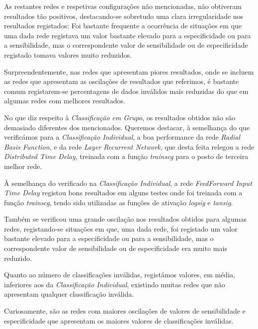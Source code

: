 \documentclass{article}
\begin{document}
As restantes redes e respetivas configurações não mencionadas, não obtiveram resultados tão positivos, destacando-se sobretudo uma clara irregularidade nos resultados registados: Foi bastante frequente a ocorrência de situações em que uma dada rede registava um valor bastante elevado para a especificidade ou para a sensibilidade, mas o correspondente valor de sensibilidade ou de especificidade registado tomava valores muito reduzidos.

Surpreendentemente, nas redes que apresentam piores resultados, onde se incluem as redes que apresentam as oscilações de resultados que referimos, é bastante comum registarem-se percentagens de dados inválidos mais reduzidas do que em algumas redes com melhores resultados.

No que diz respeito à \emph{Classificação em Grupo}, os resultados obtidos não são demasiado diferentes dos mencionados. Queremos destacar, à semelhança do que verificámos para a \emph{Classificação Individual}, a boa performance da rede \emph{Radial Basis Function}, e da rede \emph{Layer Recurrent Network}, que desta feita relegou a rede \emph{Distributed Time Delay}, treinada com a função \emph{trainscg} para o posto de terceira melhor rede.

À semelhança do verificado na \emph{Classificação Individual}, a rede \emph{FeedForward Input Time Delay} registou bons resultados em alguns testes onde foi treinada com a função \emph{trainscg}, tendo sido utilizadas as funções de ativação \emph{logsig} e \emph{tansig}.

Também se verificou uma grande oscilação nos resultados obtidos para algumas redes, registando-se situações em que, uma dada rede, foi registado um valor bastante elevado para a especificidade ou para a sensibilidade, mas o correspondente valor de sensibilidade ou de especificidade era muito mais reduzido.

Quanto ao número de classificações inválidas, registámos valores, em média, inferiores aos da \emph{Classificação Individual}, existindo muitas redes que não apresentam qualquer classificação inválida.

Curiosamente, são as redes com maiores oscilações de valores de sensibilidade e especificidade que apresentam os maiores valores de classificações inválidas.

\end{document}
